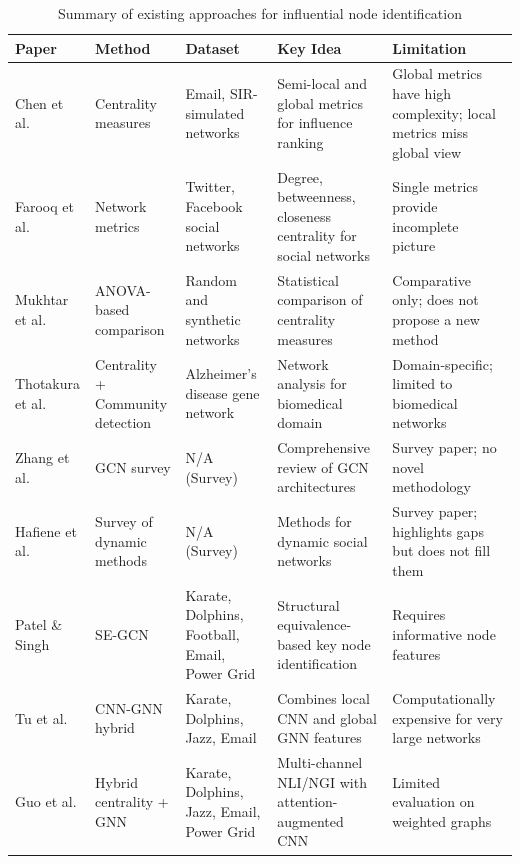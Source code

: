 \begin{table}[h]
\centering
\caption{Summary of existing approaches for influential node identification}
\label{tab:litreview}
\footnotesize
\begin{tabular}{|p{1.8cm}|p{2.2cm}|p{2.5cm}|p{3.5cm}|p{3.5cm}|}
\hline
\textbf{Paper} & \textbf{Method} & \textbf{Dataset} & \textbf{Key Idea} & \textbf{Limitation} \\
\hline
Chen et al. \cite{chen2012} & Centrality measures & Email, SIR-simulated networks & Semi-local and global metrics for influence ranking & Global metrics have high complexity; local metrics miss global view \\
\hline
Farooq et al. \cite{farooq2018} & Network metrics & Twitter, Facebook social networks & Degree, betweenness, closeness centrality for social networks & Single metrics provide incomplete picture \\
\hline
Mukhtar et al. \cite{mukhtar} & ANOVA-based comparison & Random and synthetic networks & Statistical comparison of centrality measures & Comparative only; does not propose a new method \\
\hline
Thotakura et al. \cite{thotakura2024} & Centrality + Community detection & Alzheimer's disease gene network & Network analysis for biomedical domain & Domain-specific; limited to biomedical networks \\
\hline
Zhang et al. \cite{zhang2019gcn} & GCN survey & N/A (Survey) & Comprehensive review of GCN architectures & Survey paper; no novel methodology \\
\hline
Hafiene et al. \cite{hafiene2020} & Survey of dynamic methods & N/A (Survey) & Methods for dynamic social networks & Survey paper; highlights gaps but does not fill them \\
\hline
Patel \& Singh \cite{patel2025} & SE-GCN & Karate, Dolphins, Football, Email, Power Grid & Structural equivalence-based key node identification & Requires informative node features \\
\hline
Tu et al. \cite{tu2025} & CNN-GNN hybrid & Karate, Dolphins, Jazz, Email & Combines local CNN and global GNN features & Computationally expensive for very large networks \\
\hline
Guo et al. \cite{guo2026} & Hybrid centrality + GNN & Karate, Dolphins, Jazz, Email, Power Grid & Multi-channel NLI/NGI with attention-augmented CNN & Limited evaluation on weighted graphs \\
\hline
\end{tabular}
\end{table}

